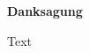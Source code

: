\begingroup
\vspace*{\fill}

\centerline{\textbf{\Large Danksagung}}

\bigskip

Text

\vspace*{\fill}
\endgroup
